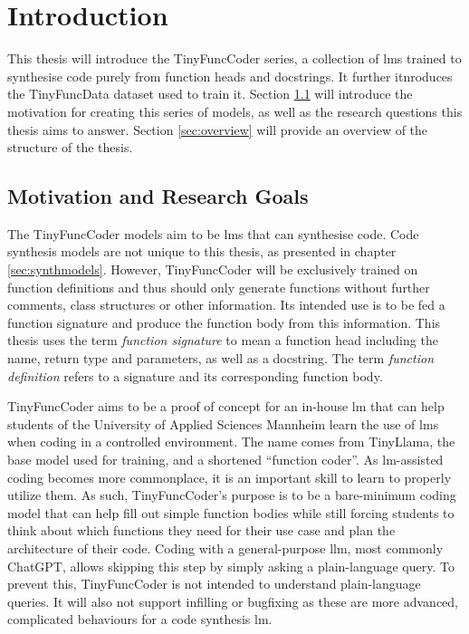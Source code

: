 \chapter{Introduction}
\label{chap:intro}

This thesis will introduce the TinyFuncCoder series, a collection of \acp{lm} trained to synthesise code purely from function heads and docstrings. It further itnroduces the TinyFuncData dataset used to train it.
Section \ref{sec:motivation} will introduce the motivation for creating this series of models, as well as the research questions this thesis aims to answer.
Section \ref{sec:overview} will provide an overview of the structure of the thesis.

\section{Motivation and Research Goals}
\label{sec:motivation}

The TinyFuncCoder models aim to be \acp{lm} that can synthesise code.
Code synthesis models are not unique to this thesis, as presented in chapter \ref{sec:synthmodels}.
However, TinyFuncCoder will be exclusively trained on function definitions and thus should only generate functions without further comments, class structures or other information.
Its intended use is to be fed a function signature and produce the function body from this information.
This thesis uses the term \emph{function signature} to mean a function head including the name, return type and parameters, as well as a docstring. The term \emph{function definition} refers to a signature and its corresponding function body.

TinyFuncCoder aims to be a proof of concept for an in-house \ac{lm} that can help students of the University of Applied Sciences Mannheim learn the use of \acp{lm} when coding in a controlled environment.
The name comes from TinyLlama, the base model used for training, and a shortened \enquote{function coder}.
As \ac{lm}-assisted coding becomes more commonplace, it is an important skill to learn to properly utilize them.
As such, TinyFuncCoder's purpose is to be a bare-minimum coding model that can help fill out simple function bodies while still forcing students to think about which functions they need for their use case and plan the architecture of their code.
Coding with a general-purpose \ac{llm}, most commonly ChatGPT, allows skipping this step by simply asking a plain-language query.
To prevent this, TinyFuncCoder is not intended to understand plain-language queries.
It will also not support infilling or bugfixing as these are more advanced, complicated behaviours for a code synthesis \ac{lm}.

